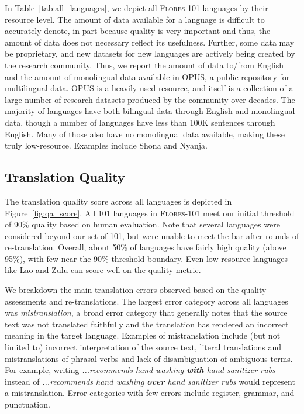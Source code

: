 In Table~\ref{tab:all_languages}, we depict all \textsc{Flores-101} languages by their resource level. The amount of data available for a language is difficult to accurately denote, in part because quality is very important and thus, the amount of data does not necessary reflect its usefulness. Further, some data may be proprietary, and new datasets for new languages are actively being created by the research community. Thus, we report the amount of data to/from English and the amount of monolingual data available in OPUS, a public repository for multilingual data. OPUS is a heavily used resource, and itself is a collection of a large number of research datasets produced by the community over decades. The majority of languages have both bilingual data through English and monolingual data, though a number of languages have less than 100K sentences through English. Many of those also have no monolingual data available, making these truly low-resource. Examples include Shona and Nyanja.

\subsection{Translation Quality} The translation quality score across all languages is depicted in Figure~\ref{fig:qa_score}. 
All 101 languages in \textsc{Flores-101} meet our initial threshold of 90\% quality based on human evaluation. Note that several languages were considered beyond our set of 101, but were unable to meet the bar after rounds of re-translation. Overall, about 50\% of languages have fairly high quality (above 95\%), with few near the 90\% threshold boundary. Even low-resource languages like Lao and Zulu can score well on the quality metric. 

We breakdown the main translation errors observed based on the quality assessments and re-translations. The largest error category across all languages was \textit{mistranslation}, a broad error category that generally notes that the source text was not translated faithfully and the translation has rendered an incorrect meaning in the target language. Examples of mistranslation include (but not limited to) incorrect interpretation of the source text, literal translations and mistranslations of phrasal verbs and lack of disambiguation of ambiguous terms. For example, writing \textit{...recommends hand washing \textbf{with} hand sanitizer rubs} instead of \textit{...recommends hand washing \textbf{over} hand sanitizer rubs} would represent a mistranslation. Error categories with few errors include register, grammar, and punctuation.

